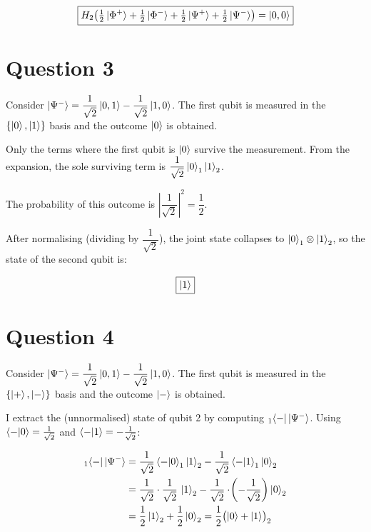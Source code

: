\documentclass[12pt,a4paper]{article}
\begin{document}
\[
  \boxed{H_2\!\left(\tfrac{1}{2}\ket{\Phi^+}+\tfrac{1}{2}\ket{\Phi^-}
         +\tfrac{1}{2}\ket{\Psi^+}+\tfrac{1}{2}\ket{\Psi^-}\right) = \ket{0,0}}
\]

\section*{Question 3}

Consider $\ket{\Psi^-}=\dfrac{1}{\sqrt{2}}\ket{0,1}-\dfrac{1}{\sqrt{2}}\ket{1,0}$.
The first qubit is measured in the $\{\ket{0},\ket{1}\}$ basis and the outcome $\ket{0}$ is obtained.

\medskip
Only the terms where the first qubit is $\ket{0}$ survive the measurement.
From the expansion, the sole surviving term is $\dfrac{1}{\sqrt{2}}\ket{0}_1\ket{1}_2$.

The probability of this outcome is $\left|\dfrac{1}{\sqrt{2}}\right|^{\!2}=\dfrac{1}{2}$.

After normalising (dividing by $\dfrac{1}{\sqrt{2}}$), the joint state collapses to
$\ket{0}_1\otimes\ket{1}_2$, so the state of the second qubit is:

\[
  \boxed{\ket{1}}
\]

\section*{Question 4}

Consider $\ket{\Psi^-}=\dfrac{1}{\sqrt{2}}\ket{0,1}-\dfrac{1}{\sqrt{2}}\ket{1,0}$.
The first qubit is measured in the $\{\ket{+},\ket{-}\}$ basis and the outcome $\ket{-}$ is obtained.

\medskip
I extract the (unnormalised) state of qubit 2 by computing
${}_{1}\!\bra{-}\ket{\Psi^-}$.
Using $\braket{-|0}=\tfrac{1}{\sqrt{2}}$ and $\braket{-|1}=-\tfrac{1}{\sqrt{2}}$:

\begin{align*}
{}_{1}\!\bra{-}\ket{\Psi^-}
  &= \frac{1}{\sqrt{2}}\braket{-|0}_1\ket{1}_2
   - \frac{1}{\sqrt{2}}\braket{-|1}_1\ket{0}_2 \\
  &= \frac{1}{\sqrt{2}}\cdot\frac{1}{\sqrt{2}}\,\ket{1}_2
   - \frac{1}{\sqrt{2}}\cdot\!\left(-\frac{1}{\sqrt{2}}\right)\ket{0}_2 \\
  &= \frac{1}{2}\ket{1}_2 + \frac{1}{2}\ket{0}_2
   = \frac{1}{2}\bigl(\ket{0}+\ket{1}\bigr)_2
\end{align*}
\end{document}
